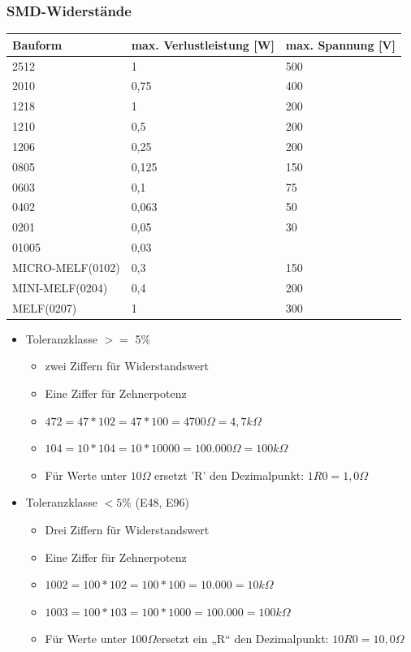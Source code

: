\subsubsection{SMD-Widerstände}
\begin{longtable}{|l|l|l|}
\hline
\textbf{Bauform}&\textbf{max. Verlustleistung [W]}&\textbf{max. Spannung [V]}\\
\hline
\hline
2512&1&500\\
\hline
2010&0,75&400\\
\hline
1218&1&200\\
\hline
1210&0,5&200\\
\hline
1206&0,25&200\\
\hline
0805&0,125&150\\
\hline
0603&0,1&75\\
\hline
0402&0,063&50\\
\hline
0201&0,05&30\\
\hline
01005&0,03&\\
\hline
MICRO-MELF(0102)&0,3&150\\
\hline
MINI-MELF(0204)&0,4&200\\
\hline
MELF(0207)&1&300\\
\hline
\end{longtable}

\begin{itemize}
  \item Toleranzklasse $>=$ 5\%
  \begin{itemize}
    \item zwei Ziffern für Widerstandswert
    \item Eine Ziffer für Zehnerpotenz
    \item $472=47*102 =47*100=4700\Omega=4,7k\Omega$
    \item $104=10*104 =10*10000=100.000\Omega=100k\Omega$
    \item Für Werte unter $10 \Omega$ ersetzt 'R' den Dezimalpunkt: $1R0 =
    1,0\Omega$
   \end{itemize}
   \item Toleranzklasse $< 5$\% (E48, E96)
   \begin{itemize}
     \item Drei Ziffern für Widerstandswert
     \item Eine Ziffer für Zehnerpotenz
     \item $1002=100*102 =100*100=10.000=10k\Omega$
     \item $1003=100*103 =100*1000=100.000=100k\Omega$
     \item Für Werte unter $100\Omega$ersetzt ein „R“ den Dezimalpunkt: $10R0 =
     10,0\Omega$
    \end{itemize}
\end{itemize}
\newpage
